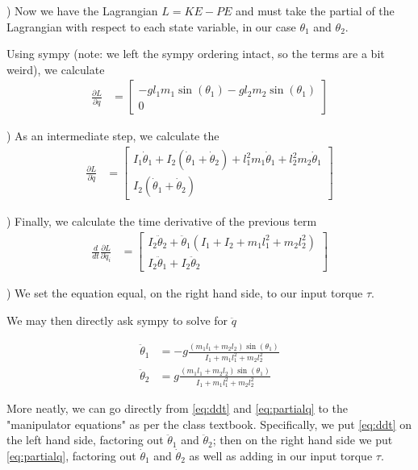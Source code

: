 \documentclass[conference]{IEEEtran}
\begin{document}
) Now we have the Lagrangian $L = KE - PE$ and must take the partial of the Lagrangian with
respect to each state variable, in our case $\theta_1$ and $\theta_2$.

Using sympy (note: we left the sympy ordering intact, so the terms are a
bit weird), we calculate
\begin{align}
    \frac{\partial L}{\partial q} &=
    \begin{bmatrix}
        -g l_1 m_1 \sin(\theta_1) - g l_2 m_2 \sin(\theta_1) \\
        0
    \end{bmatrix}
    \label{eq:partialq}
\end{align}

) As an intermediate step, we calculate the
\begin{align}
    \frac{\partial L}{\partial \dot q} &=
    \begin{bmatrix}
        I_1 \dot\theta_1 + I_2 (\dot\theta_1 + \dot\theta_2) +
            l_1^2 m_1 \dot\theta_1 + l_2^2 m_2 \dot \theta_1 \\
            I_2 (\dot \theta_1 + \dot\theta_2)
    \end{bmatrix}
    \label{eq:partialqdot}
\end{align}

) Finally, we calculate the time derivative of the previous term
\begin{align}
    \frac{d}{dt} \frac{\partial L}{\partial \dot q_i} &=
    \begin{bmatrix}
    I_2 \ddot\theta_2 + \ddot\theta_1 ( I_1 +  I_2 +  m_1 l_1^2 + m_2 l_2^2) \\
    I_2 \ddot\theta_1 + I_2 \ddot\theta_2
    \end{bmatrix}
    \label{eq:ddt}
\end{align}

) We set the equation equal, on the right hand side, to our input torque $\tau$.

We may then directly ask sympy to solve for $\ddot q$

\begin{align}
    \ddot \theta_1 &= -g \frac{ (m_1 l_1 + m_2 l_2) \sin(\theta_1)}
        {I_1 + m_1 l_1^2 + m_2 l_2^2} \\
    \ddot \theta_2 &= g \frac{ (m_1 l_1 + m_2 l_2) \sin(\theta_1) }
        {I_1 + m_1 l_1^2 + m_2 l_2^2}
\end{align}

More neatly, we can go directly from \cref{eq:ddt} and
\cref{eq:partialq} to the "manipulator equations" as per the class textbook.
Specifically, we put \cref{eq:ddt} on the left hand side, factoring out
$\ddot \theta_1$ and $\ddot \theta_2$; then on the right hand side we put
\cref{eq:partialq}, factoring out $\dot \theta_1$ and $\dot \theta_2$ as well as
adding in our input torque $\tau$.
\end{document}
